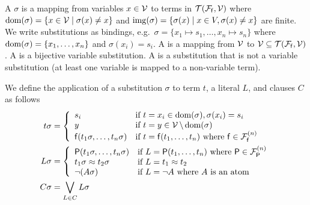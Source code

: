


\begin{definition}\label{def:substitution}
	A  \( \sigma \) is a mapping from variables \( x\in\mathcal{V} \) to terms in \( {\mathcal{T}(\mathcal{F}_{\mathsf{f}},\mathcal{V})} \)
	where \( \operatorname{dom}(\sigma) = \{ x\in\mathcal{V}\mid\sigma(x) \neq x \} \)
	and  \( \operatorname{img}(\sigma) =\{ \sigma(x) \mid x\in V, \sigma(x)\neq x \} \) are finite.
	We write substitutions as bindings, e.g.~\( \sigma=\{ x_1\mapsto s_1,\ldots,x_n\mapsto s_n \} \)
	where \( \operatorname{dom}(\sigma)=\{ x_1,\ldots,x_n \} \) and \( \sigma(x_i)=s_i \).
	A  is a mapping from \( \mathcal{V} \) to \( \mathcal{V}\subseteq{\mathcal{T}(\mathcal{F}_{\mathsf{f}},\mathcal{V})} \).
	A  is a bijective variable substitution.
	A  is a substitution that is not a variable substitution
	(at least one variable is mapped to a non-variable term).
\end{definition}
\begin{definition}\label{def:term:literal:clause:substitution}
	We define the application of a substitution \( \sigma \)
	to term \( t \), a literal \( L \), and clauses \( C \) as follows
	\begin{align*}
	t\sigma &=
	\left \{
		\begin{array}{ll}
			s_i & \text{if }t=x_i\in\operatorname{dom}(\sigma), \sigma(x_i) = s_i
			\\
			y & \text{if }t=y\in\mathcal{V} \, \backslash\operatorname{dom}(\sigma)
			\\
			\mathsf{f}(t_1\sigma,\ldots,t_n\sigma)	&\text{if }t=\mathsf{f}(t_1,\ldots,t_n)
			\text{ where  }\mathsf{f}\in{\mathcal{F}^{(n)}_{\mathsf{f}}}
		\end{array}
	\right.
			 \\
	L\sigma{} &=
	\left \{
		\begin{array}{ll}
			\mathsf{P}(t_1\sigma,\ldots,t_n\sigma)
			&\text{if }L=\mathsf{P}(t_1,\ldots,t_n)
			\text{ where  }\mathsf{P}\in{\mathcal{F}^{(n)}_{\mathsf{P}}}
			\\
			t_1\sigma\approx t_2\sigma
			&\text{if } L = t_1\approx t_2
			\\
			\lnot(A\sigma)&\text{if } L=\lnot A\text{ where }A\text{ is an atom}
		\end{array}
	\right.
	\\
	C \sigma{} &=
\bigvee_{
	L\in{} C
}
	L \sigma{}
	\end{align*}
\end{definition}

